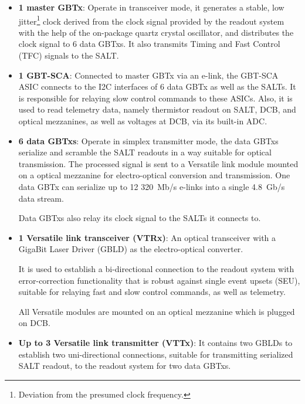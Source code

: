 \begin{itemize}
    \item \textbf{1 master GBTx}:
        Operate in transceiver mode,
        it generates a stable, low jitter\footnote{
            Deviation from the presumed clock frequency.
        } clock derived from the clock signal provided by the readout system
        with the help of the on-package quartz crystal oscillator,
        and distributes the clock signal to 6 data GBTxs.
        It also transmits Timing and Fast Control (TFC) signals to the SALT.

    \item \textbf{1 GBT-SCA}:
        Connected to master GBTx via an e-link,
        the GBT-SCA ASIC connects to the I2C interfaces
        of 6 data GBTx as well as the SALTs.
        It is responsible for relaying slow control commands to these ASICs.
        Also, it is used to read telemetry data,
        namely thermistor readout on SALT, DCB, and optical mezzanines,
        as well as voltages at DCB,
        via its built-in ADC.

    \item \textbf{6 data GBTxs}:
        Operate in simplex transmitter mode,
        the data GBTxs serialize and scramble the SALT readouts in a way
        suitable for optical transmission.
        The processed signal is sent to a Versatile link module mounted on
        a optical mezzanine for electro-optical conversion and transmission.
        One data GBTx can serialize up to 12 320~Mb/s e-links into a single
        4.8~Gb/s data stream.

        Data GBTxs also relay its clock signal to the SALTs it connects to.

    \item \textbf{1 Versatile link transceiver (VTRx)}:
        An optical transceiver with a GigaBit Laser Driver (GBLD)
        as the electro-optical converter.

        It is used to establish a bi-directional connection to the readout
        system with error-correction functionality that is robust against single
        event upsets (SEU),
        suitable for relaying fast and slow control commands, as well as
        telemetry.

        All Versatile modules are mounted on an optical mezzanine which is
        plugged on DCB.

    \item \textbf{Up to 3 Versatile link transmitter (VTTx)}:
        It contains two GBLDs to establish two uni-directional connections,
        suitable for transmitting serialized SALT readout,
        to the readout system for two data GBTxs.
\end{itemize}

